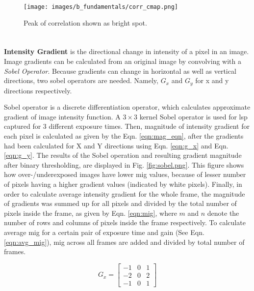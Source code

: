     \begin{figure}[h]
        \hspace{40pt}
        \texttt{[image: images/b\_fundamentals/corr\_cmap.png]}
        \caption{Peak of correlation shown as bright spot.}
        \label{fig:corr_cmap.png}
    \end{figure}

    

    \section*{}\label{section:mig}
    \textbf{Intensity Gradient} is the directional change in intensity of a pixel in an image. Image gradients can be calculated from an original image by convolving with a \emph{Sobel Operator}. Because gradients can change in horizontal as well as vertical directions, two sobel operators are needed. Namely, $G_x$ and $G_y$ for x and y directions respectively.
    
    \vspace{5mm}
    \noindent Sobel operator is a discrete differentiation operator, which calculates approximate gradient of image intensity function. A $3\times3$ kernel Sobel operator is used for \gls{lsp} captured for 3 different exposure times. Then, magnitude of intensity gradient for each pixel is calculated as given by the Eqn. \ref{eqn:mag_eqn}, after the gradients had been calculated for X and Y directions using Eqn. \ref{eqn:g_x} and Eqn. \ref{eqn:g_y}. The results of the Sobel operation and resulting gradient magnitude after binary thresholding, are displayed in Fig. \ref{fig:sobel.png}. This figure shows how over-/underexposed images have lower \gls{mig} values, because of lesser number of pixels having a higher gradient values (indicated by white pixels). Finally, in order to calculate average intensity gradient for the whole frame, the magnitude of gradients was summed up for all pixels and divided by the total number of pixels inside the frame, as given by Eqn. \ref{eqn:mig}, where $m$ and $n$ denote the number of rows and columns of pixels inside the frame respectively. To calculate average \gls{mig} for a certain pair of exposure time and gain (See Eqn. \ref{eqn:avg_mig}), \gls{mig} across all frames are added and divided by total number of frames. 
    
    \begin{equation}
        G_x = 
        \begin{bmatrix}
            -1 & 0 & 1 \\
            -2 & 0 & 2 \\
            -1 & 0 & 1 
        \end{bmatrix}
        \label{eqn:g_x}
    \end{equation}

